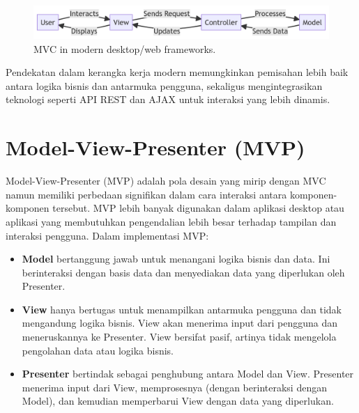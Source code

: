 \begin{figure}[h]
	\centering
	\includegraphics[width=\textwidth]{../images/mvc-modern.png}
	\caption{MVC in modern desktop/web frameworks.}
	\label{fig:mvc-modern}
\end{figure}

Pendekatan dalam kerangka kerja modern memungkinkan pemisahan lebih baik antara logika bisnis dan antarmuka pengguna, sekaligus mengintegrasikan teknologi seperti API REST dan AJAX untuk interaksi yang lebih dinamis.


\section{Model-View-Presenter (MVP)}

Model-View-Presenter (MVP) adalah pola desain yang mirip dengan MVC namun memiliki perbedaan signifikan dalam cara interaksi antara komponen-komponen tersebut. MVP lebih banyak digunakan dalam aplikasi desktop atau aplikasi yang membutuhkan pengendalian lebih besar terhadap tampilan dan interaksi pengguna. Dalam implementasi MVP:

\begin{itemize}
	\item \textbf{Model} bertanggung jawab untuk menangani logika bisnis dan data. Ini berinteraksi dengan basis data dan menyediakan data yang diperlukan oleh Presenter.
	\item \textbf{View} hanya bertugas untuk menampilkan antarmuka pengguna dan tidak mengandung logika bisnis. View akan menerima input dari pengguna dan meneruskannya ke Presenter. View bersifat pasif, artinya tidak mengelola pengolahan data atau logika bisnis.
	\item \textbf{Presenter} bertindak sebagai penghubung antara Model dan View. Presenter menerima input dari View, memprosesnya (dengan berinteraksi dengan Model), dan kemudian memperbarui View dengan data yang diperlukan.
\end{itemize}

